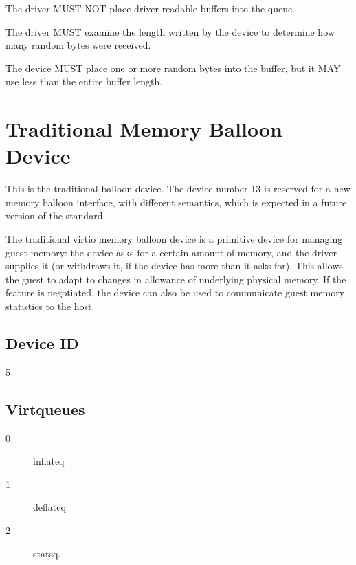 
The driver MUST NOT place driver-readable buffers into the queue.

The driver MUST examine the length written by the device to determine
how many random bytes were received.


The device MUST place one or more random bytes into the buffer, but it
MAY use less than the entire buffer length.

\section{Traditional Memory Balloon Device}\label{sec:Device Types / Memory Balloon Device}

This is the traditional balloon device.  The device number 13 is
reserved for a new memory balloon interface, with different
semantics, which is expected in a future version of the standard.

The traditional virtio memory balloon device is a primitive device for
managing guest memory: the device asks for a certain amount of
memory, and the driver supplies it (or withdraws it, if the device
has more than it asks for). This allows the guest to adapt to
changes in allowance of underlying physical memory. If the
feature is negotiated, the device can also be used to communicate
guest memory statistics to the host.

\subsection{Device ID}\label{sec:Device Types / Memory Balloon Device / Device ID}
  5

\subsection{Virtqueues}\label{sec:Device Types / Memory Balloon Device / Virtqueues}
\begin{description}
\item[0] inflateq
\item[1] deflateq
\item[2] statsq.
\end{description}

